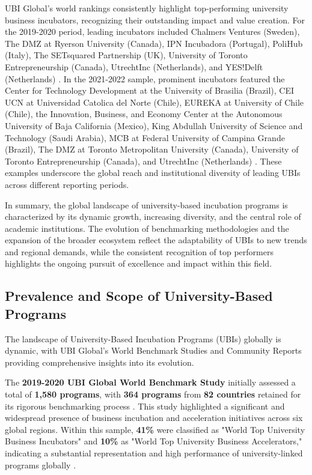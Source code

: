 \documentclass[../Main.tex]{subfiles}%
\begin{document}
	UBI Global's world rankings consistently highlight top-performing university business incubators, recognizing their outstanding impact and value creation. For the 2019-2020 period, leading incubators included Chalmers Ventures (Sweden), The DMZ at Ryerson University (Canada), IPN Incubadora (Portugal), PoliHub (Italy), The SETsquared Partnership (UK), University of Toronto Entrepreneurship (Canada), UtrechtInc (Netherlands), and YES!Delft (Netherlands) \autocite{ubi2019world}. In the 2021-2022 sample, prominent incubators featured the Center for Technology Development at the University of Brasilia (Brazil), CEI UCN at Universidad Catolica del Norte (Chile), EUREKA at University of Chile (Chile), the Innovation, Business, and Economy Center at the Autonomous University of Baja California (Mexico), King Abdullah University of Science and Technology (Saudi Arabia), MCB at Federal University of Campina Grande (Brazil), The DMZ at Toronto Metropolitan University (Canada), University of Toronto Entrepreneurship (Canada), and UtrechtInc (Netherlands) \autocite{ubi2021world}. These examples underscore the global reach and institutional diversity of leading UBIs across different reporting periods.
	
	In summary, the global landscape of university-based incubation programs is characterized by its dynamic growth, increasing diversity, and the central role of academic institutions. The evolution of benchmarking methodologies and the expansion of the broader ecosystem reflect the adaptability of UBIs to new trends and regional demands, while the consistent recognition of top performers highlights the ongoing pursuit of excellence and impact within this field.
	
	\subsection{Prevalence and Scope of University-Based Programs}
	The landscape of University-Based Incubation Programs (UBIs) globally is dynamic, with UBI Global's World Benchmark Studies and Community Reports providing comprehensive insights into its evolution.
	
	The \textbf{2019-2020 UBI Global World Benchmark Study} initially assessed a total of \textbf{1,580 programs}, with \textbf{364 programs} from \textbf{82 countries} retained for its rigorous benchmarking process \autocite{ubi2019world}. This study highlighted a significant and widespread presence of business incubation and acceleration initiatives across six global regions. Within this sample, \textbf{41\%} were classified as "World Top University Business Incubators" and \textbf{10\%} as "World Top University Business Accelerators," indicating a substantial representation and high performance of university-linked programs globally \autocite{ubi2019world}.
	
\end{document}
